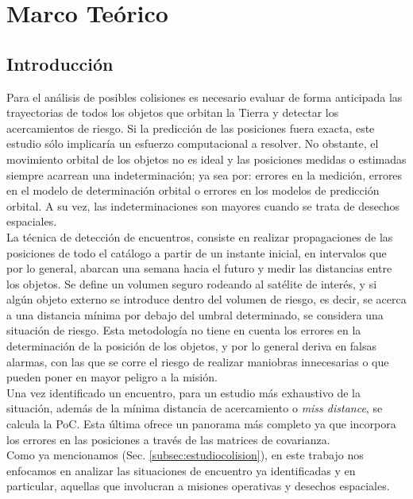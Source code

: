 \chapter{Marco Teórico}
\label{chap:marcoteorico}

\section{Introducci\'on}

Para el an\'alisis de posibles colisiones es necesario evaluar de forma anticipada las trayectorias de todos los objetos que orbitan la Tierra y detectar los acercamientos de riesgo. Si la predicci\'on de las posiciones fuera exacta, este estudio s\'olo implicar\'ia un esfuerzo computacional a resolver. No obstante, el movimiento orbital de los objetos no es ideal y las posiciones medidas o estimadas siempre acarrean una indeterminaci\'on; ya sea por: errores en la medici\'on, errores en el modelo de determinaci\'on orbital o errores en los modelos de predicci\'on orbital. A su vez, las indeterminaciones son mayores cuando se trata de desechos espaciales.\\

La t\'ecnica de detecci\'on de encuentros, consiste en realizar propagaciones de las posiciones de todo el cat\'alogo a partir de un instante inicial, en intervalos que por lo general, abarcan una semana hacia el futuro y medir las distancias entre los objetos. Se define un volumen seguro rodeando al sat\'elite de inter\'es, y si alg\'un objeto externo se introduce dentro del volumen de riesgo, es decir, se acerca a una distancia m\'inima por debajo del umbral determinado, se considera una situaci\'on de riesgo. 
Esta metodolog\'ia no tiene en cuenta los errores en la determinaci\'on de la posici\'on de los objetos, y por lo general deriva en falsas alarmas, con las que se corre el riesgo de realizar maniobras innecesarias o que pueden poner en mayor peligro a la misi\'on.\\

Una vez identificado un encuentro, para un estudio m\'as exhaustivo de la situaci\'on, adem\'as de la m\'inima distancia de acercamiento o {\it{miss distance}}, se calcula la PoC.  Esta \'ultima ofrece un panorama m\'as completo ya que incorpora los errores en las posiciones a trav\'es de las matrices de covarianza.\\

Como ya mencionamos (Sec. \ref{subsec:estudiocolision}), en este trabajo nos enfocamos en analizar las situaciones de encuentro ya identificadas y en particular, aquellas que involucran a misiones operativas y desechos espaciales.\\

